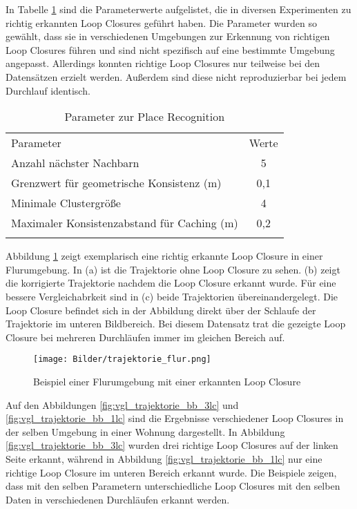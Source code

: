 In Tabelle \ref{tab:Parameter_PR} sind die Parameterwerte aufgelistet, die in diversen Experimenten zu richtig erkannten Loop Closures geführt haben. Die Parameter wurden so gewählt, dass sie in verschiedenen Umgebungen zur Erkennung von richtigen Loop Closures führen und sind nicht spezifisch auf eine bestimmte Umgebung angepasst. Allerdings konnten richtige Loop Closures nur teilweise bei den Datensätzen erzielt werden. Außerdem sind diese nicht reproduzierbar bei jedem Durchlauf identisch.  

\renewcommand{\arraystretch}{1}
\begin {table}[H]
 \centering
 \caption{Parameter zur Place Recognition}
 \label{tab:Parameter_PR}
 \begin{tabular}{ l c }
  \hhline{==}
   Parameter    & Werte  \\
  \hhline{==}
  Anzahl nächster Nachbarn &  5  \\
  \hhline{--}
  Grenzwert für geometrische Konsistenz (m) &  0,1  \\
  \hhline{--}
  Minimale Clustergröße &  4  \tabularnewline
  \hhline{--}
  Maximaler Konsistenzabstand für Caching (m) &  0,2 \\
  \hhline{==}
 \end{tabular}
\end{table}

Abbildung \ref{fig:vgl_trajektorie_match_flur} zeigt  exemplarisch eine richtig erkannte Loop Closure in einer Flurumgebung. In (a) ist die Trajektorie ohne Loop Closure zu sehen. (b) zeigt die korrigierte Trajektorie nachdem die Loop Closure erkannt wurde. Für eine bessere Vergleichabrkeit sind in (c) beide Trajektorien übereinandergelegt. Die Loop Closure befindet sich in der Abbildung direkt über der Schlaufe der Trajektorie im unteren Bildbereich. Bei diesem Datensatz trat die gezeigte Loop Closure bei mehreren Durchläufen immer im gleichen Bereich auf. 

\begin{figure}
	\centering
	\texttt{[image: Bilder/trajektorie\_flur.png]}
	\caption{Beispiel einer Flurumgebung mit einer erkannten Loop Closure}
	\label{fig:vgl_trajektorie_match_flur}
\end{figure}

Auf den Abbildungen \ref{fig:vgl_trajektorie_bb_3lc} und  \ref{fig:vgl_trajektorie_bb_1lc} sind die Ergebnisse verschiedener Loop Closures in der selben Umgebung in einer Wohnung dargestellt. In Abbildung \ref{fig:vgl_trajektorie_bb_3lc} wurden drei richtige Loop Closures auf der linken Seite erkannt, während in Abbildung \ref{fig:vgl_trajektorie_bb_1lc} nur eine richtige Loop Closure im unteren Bereich erkannt wurde. Die Beispiele zeigen, dass mit den selben Parametern unterschiedliche Loop Closures mit den selben Daten in verschiedenen Durchläufen erkannt werden. 

